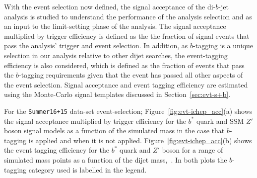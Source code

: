 With the event selection now defined,
the signal acceptance of the di-$b$-jet analysis is studied
to understand the performance of the analysis selection
and as an input to the limit-setting phase of the analysis.
The signal acceptance multiplied by trigger efficiency is defined as the 
the fraction of signal events that pass the analysis' trigger and event selection.
In addition, as $b$-tagging is a unique selection in our analysis relative to other dijet searches,
the event-tagging efficiency is also considered, which is defined as the fraction of events that pass
the $b$-tagging requirements given that the event has passed all other aspects of the event selection.
Signal acceptance and event tagging efficiency are estimated using the
Monte-Carlo signal templates discussed in Section~\ref{sec:evt-s+b}.

For the \verb|Summer16+15| data-set event-selection;
Figure~\ref{fig:evt-ichep_acc}(a) shows the signal acceptance multiplied by trigger efficiency
for the $b^*$ quark and SSM $Z'$ boson signal models
as a function of the simulated mass
in the case that $b$-tagging is applied and when it is not applied.
Figure~\ref{fig:evt-ichep_acc}(b) shows the event tagging efficiency
for the $b^*$ quark and $Z'$ boson for a range of simulated mass points
as a function of the dijet mass,~\mjj.
In both plots the $b$-tagging category used is labelled in the legend.


